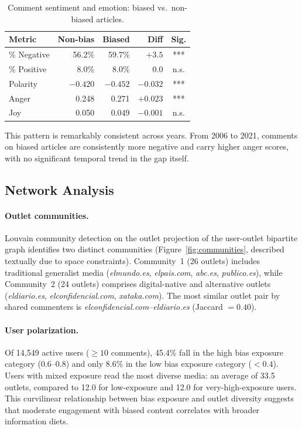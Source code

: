 \begin{table}[t]
\centering
\small
\begin{tabular}{lrrrc}
\toprule
\textbf{Metric} & \textbf{Non-bias} & \textbf{Biased} & \textbf{Diff} & \textbf{Sig.} \\
\midrule
\% Negative & 56.2\% & 59.7\% & $+3.5$ & *** \\
\% Positive & 8.0\% & 8.0\% & $0.0$ & n.s. \\
Polarity & $-0.420$ & $-0.452$ & $-0.032$ & *** \\
Anger & 0.248 & 0.271 & $+0.023$ & *** \\
Joy & 0.050 & 0.049 & $-0.001$ & n.s. \\
\bottomrule
\end{tabular}
\caption{Comment sentiment and emotion: biased vs.\ non-biased articles.}
\label{tab:sentiment}
\end{table}

This pattern is remarkably consistent across years.
From 2006 to 2021, comments on biased articles are consistently more negative and carry higher anger scores, with no significant temporal trend in the gap itself.

\subsection{Network Analysis}

\paragraph{Outlet communities.}
Louvain community detection on the outlet projection of the user-outlet bipartite graph identifies two distinct communities (Figure~\ref{fig:communities}, described textually due to space constraints).
Community~1 (26 outlets) includes traditional generalist media (\textit{elmundo.es}, \textit{elpais.com}, \textit{abc.es}, \textit{publico.es}), while Community~2 (24 outlets) comprises digital-native and alternative outlets (\textit{eldiario.es}, \textit{elconfidencial.com}, \textit{xataka.com}).
The most similar outlet pair by shared commenters is \textit{elconfidencial.com}--\textit{eldiario.es} (Jaccard $= 0.40$).

\paragraph{User polarization.}
Of 14,549 active users (${}\geq 10$ comments), 45.4\% fall in the high bias exposure category ($0.6$--$0.8$) and only 8.6\% in the low bias exposure category ($< 0.4$).
Users with mixed exposure read the most diverse media: an average of 33.5 outlets, compared to 12.0 for low-exposure and 12.0 for very-high-exposure users.
This curvilinear relationship between bias exposure and outlet diversity suggests that moderate engagement with biased content correlates with broader information diets.

